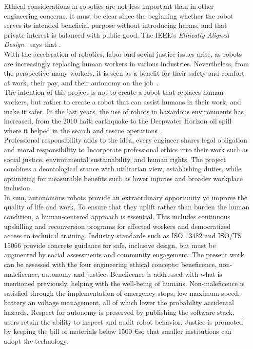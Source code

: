 Ethical considerations in robotics are not less important than in other engineering concerns. It must be clear since the beginning whether the robot serves its intended beneficial purpose without introducing harms, and that private interest is balanced with public good. The IEEE's \textit{Ethically Aligned Design}~\cite{8058187} says that .\\
With the acceleration of robotics, labor and social justice issues arise, as robots are increasingly replacing human workers in various industries. Nevertheless, from the perspective many workers, it is seen as a benefit for their safety and comfort at work, their pay, and their autonomy on the job~\cite{armstrong2024automationworkersperspective}.\\
The intention of this project is not to create a robot that replaces human workers, but rather to create a robot that can assist humans in their work, and make it safer. In the last years, the use of robots in hazardous environments has increased, from the 2010 haiti earthquake to the Deepwater Horizon oil spill where it helped in the search and rescue operations~\cite{10.7551/mitpress/9407.003.0012}.\\
Professional responsibility adds to the idea, every engineer shares legal obligation and moral responsibility to Incorporate professional ethics into their work such as social justice, environmental sustainability, and human rights. The project combines a deontological stance with utilitarian view, establishing duties, while optimizing for measurable benefits such as lower injuries and broader workplace inclusion.\\
In sum, autonomous robots provide an extraordinary opportunity yo improve the quality of life and work, To ensure that they uplift rather than burden the human condition, a human-centered approach is essential. This includes continuous upskilling and reconversion programs for affected workers and democratized access to technical training. Industry standards such as ISO 13482 and ISO/TS 15066 provide concrete guidance for safe, inclusive design, but must be augmented by social assessments and community engagement.
The present work can be assessed with the four engineering ethical concepts: beneficence, non-maleficence, autonomy and justice. Beneficence is addressed with what is mentioned previously, helping with the well-being of humans.
Non-maleficence is satisfied through the implementation of emergency stops, low maximum speed, battery an voltage management, all of which lower the probability accidental hazards.
Respect for autonomy is preserved by publishing the software stack, users retain the ability to inspect and audit robot behavior.
Justice is promoted by keeping the bill of materials below 1500 \euro so that smaller institutions can adopt the technology.


